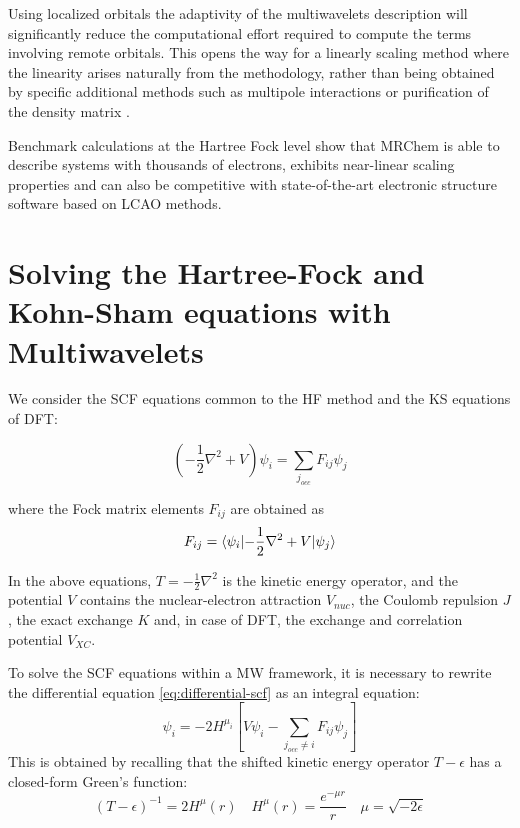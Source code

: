 \documentclass[%
 aip,
 amsmath,amssymb,
 reprint,%
]{revtex4-1}
\begin{document}
Using localized orbitals the adaptivity of the multiwavelets description will significantly reduce the computational effort required to compute the terms involving remote orbitals. This opens the way for a linearly scaling method where the linearity arises naturally from the methodology, rather than being obtained by specific additional methods such as multipole interactions or purification of the density matrix \cite{trygve}.

Benchmark calculations at the Hartree Fock level show that MRChem is able to describe systems with thousands of electrons, exhibits near-linear scaling properties and can also be competitive with state-of-the-art electronic structure software based on LCAO methods.


\section{Solving the Hartree-Fock and Kohn-Sham equations with Multiwavelets}

We consider the SCF equations common to the HF method and the KS equations of DFT:

\begin{equation}\label{eq:differential-scf}
  \left( -\frac{1}{2}\nabla^2 + V \right) \psi_i = \sum_{j_{occ}} F_{ij} \psi_j
\end{equation}

where the Fock matrix elements $F_{ij}$ are obtained as
\begin{equation}\label{eq:fock-matrix-definition}
  F_{ij} = \braket{ {\psi_i}|{-\frac{1}{2}\nabla^2+V}|{\psi_j}}
\end{equation}

In the above equations, $T = -\frac{1}{2}\nabla^2$ is the kinetic energy operator, and the potential $V$ contains the nuclear-electron attraction $V_{nuc}$, the Coulomb repulsion $J$, the exact exchange $K$ and, in case of DFT, the exchange and correlation potential $V_{XC}$. 

To solve the SCF equations within a MW framework, it is necessary to rewrite the differential equation \ref{eq:differential-scf} as an integral equation:
\begin{equation}\label{eq:integral-scf}
\psi_i = -2 H^{\mu_i}\left[V\psi_i - \sum_{j_{occ} \ne i} F_{ij} \psi_j\right]
\end{equation}
This is obtained by recalling that the shifted kinetic energy operator $T-\epsilon$ has a closed-form Green's function:
\begin{equation}\label{eq:helmholtz-green}
    (T-\epsilon)^{-1} = 2 H^{\mu}(r) \quad H^{\mu}(r) = \frac{e^{-\mu r}}{r} \quad \mu = \sqrt{-2\epsilon} 
\end{equation}
\end{document}
